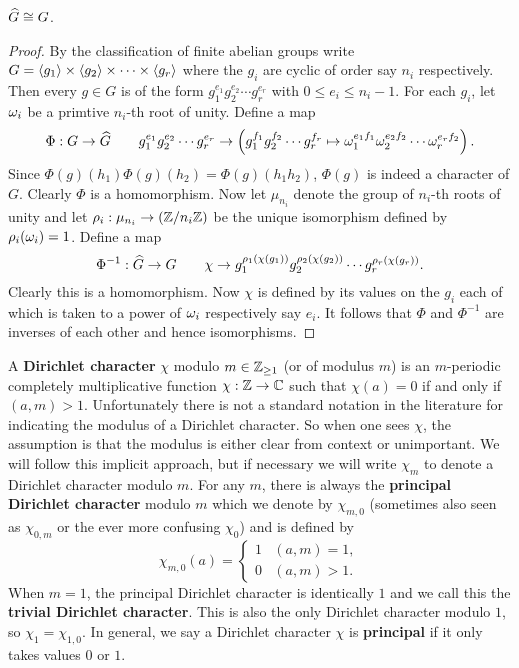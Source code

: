       \begin{proposition}\label{prop:dual_character_isomorphism}
        $\widehat{G} \cong G$.
      \end{proposition}
      \begin{proof}
        By the classification of finite abelian groups write $G = \langle g_{1}\rangle \times \langle g_{2}\rangle \times \cdots \times \langle g_{r}\rangle$ where the $g_{i}$ are cyclic of order say $n_{i}$ respectively. Then every $g \in G$ is of the form $g_{1}^{e_{1}}g_{2}^{e_{2}} \cdots g_{r}^{e_{r}}$ with $0 \le e_{i} \le n_{i}-1$. For each $g_{i}$, let $\omega_{i}$ be a primtive $n_{i}$-th root of unity. Define a map
        \[
          \Phi:G \to \widehat{G} \qquad g_{1}^{e_{1}}g_{2}^{e_{2}} \cdots g_{r}^{e_{r}} \to \left(g_{1}^{f_{1}}g_{2}^{f_{2}} \cdots g_{r}^{f_{r}} \mapsto \omega_{1}^{e_{1}f_{1}}\omega_{2}^{e_{2}f_{2}} \cdots \omega_{r}^{e_{r}f_{2}} \right).
        \]
        Since $\Phi(g)(h_{1})\Phi(g)(h_{2}) = \Phi(g)(h_{1}h_{2})$, $\Phi(g)$ is indeed a character of $G$. Clearly $\Phi$ is a homomorphism. Now let $\mu_{n_{i}}$ denote the group of $n_{i}$-th roots of unity and let $\rho_{i}:\mu_{n_{i}} \to (\mathbb{Z}/n_{i}\mathbb{Z})$ be the unique isomorphism defined by $\rho_{i}(\omega_{i}) = 1$. Define a map
        \[
          \Phi^{-1}:\widehat{G} \to G \qquad \chi \to g_{1}^{\rho_{1}(\chi(g_{1}))}g_{2}^{\rho_{2}(\chi(g_{2}))} \cdots g_{r}^{\rho_{r}(\chi(g_{r}))}.
        \]
        Clearly this is a homomorphism. Now $\chi$ is defined by its values on the $g_{i}$ each of which is taken to a power of $\omega_{i}$ respectively say $e_{i}$. It follows that $\Phi$ and $\Phi^{-1}$ are inverses of each other and hence isomorphisms.
      \end{proof}

      A \textbf{Dirichlet character} $\chi$ modulo $m \in \mathbb{Z}_{\ge 1}$ (or of modulus $m$) is an $m$-periodic completely multiplicative function $\chi:\mathbb{Z} \to \mathbb{C}$ such that $\chi(a) = 0$ if and only if $(a,m) > 1$. Unfortunately there is not a standard notation in the literature for indicating the modulus of a Dirichlet character. So when one sees $\chi$, the assumption is that the modulus is either clear from context or unimportant. We will follow this implicit approach, but if necessary we will write $\chi_{m}$ to denote a Dirichlet character modulo $m$. For any $m$, there is always the \textbf{principal Dirichlet character} modulo $m$ which we denote by $\chi_{m,0}$ (sometimes also seen as $\chi_{0,m}$ or the ever more confusing $\chi_{0}$) and is defined by
      \[
        \chi_{m,0}(a) = \begin{cases} 1 & (a,m) = 1, \\ 0 & (a,m) > 1. \end{cases}
      \]
      When $m = 1$, the principal Dirichlet character is identically $1$ and we call this the \textbf{trivial Dirichlet character}. This is also the only Dirichlet character modulo $1$, so $\chi_{1} = \chi_{1,0}$. In general, we say a Dirichlet character $\chi$ is \textbf{principal} if it only takes values $0$ or $1$.

